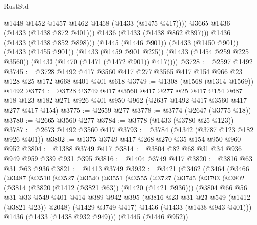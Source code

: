 \begin{lexlean}{RustStd}
\begin{coremodule}
                  @1448
                  @1452
                  @1457
                  @1462
                  @1468
                  (@1433 (@1475 @417))))
              @3665
              @1436
              (@1433 (@1438 @872 @401)))
            @1436
            (@1433 (@1438 @862 @897)))
          @1436
          (@1433 (@1438 @852 @898)))
        (@1445 (@1446 @901))
        (@1433 (@1450 @901))
        (@1433 (@1455 @901))
        (@1433 (@1459 @901 @225))
        (@1433 (@1464 @259 @225 @3560))
        (@1433 (@1470 (@1471 (@1472 @901)) @417))))
@3728 := @2597 @1492
@3745 := @3728 @1492 @417 @3560 @417 @277 @3565 @417 @154 @966 @23 @128 @25 @172 @668 @401 @401 @618
@3749 := @1308 (@1568 (@1314 @1569)) @1492
@3774 := @3728
    @3749
    @417
    @3560
    @417
    @277
    @25
    @417
    @154
    @687
    @18
    @123
    @182
    @271
    @926
    @401
    @950
    @962
    (@2637 @1492 @417 @3560 @417 @277 @417 @154)
@3775 := @2659 @277
@3778 := @3774 (@2647 (@3775 @18))
@3780 := @2665 @3560 @277
@3784 := @3778 (@1433 (@3780 @25 @123))
@3787 := @2673 @1492 @3560 @417
@3793 := @3784 (@1342 (@3787 @123 @182 @926 @401))
@3802 := @1375 @3749 @417 @268 @270 @35 @154 @950 @960 @952
@3804 := @1388 @3749 @417
@3814 := @3804 @82 @68 @31 @34 @936 @949 @959 @389 @931 @395
@3816 := @1404 @3749 @417
@3820 := @3816 @63 @31 @63 @936
@3821 := @1413 @3749
@3932 := @3421
    (@3462
      (@3464
        (@3466
          (@3487
            (@3510
              (@3527
                (@3540
                  (@3551
                    (@3555
                      (@3727
                        (@3745
                          (@3793
                            (@3802
                              (@3814
                                (@3820 (@1412 (@3821 @63)) (@1420 (@1421 @936)))
                                (@3804
                                  @66
                                  @56
                                  @31
                                  @33
                                  @549
                                  @401
                                  @414
                                  @389
                                  @942
                                  @395
                                  (@3816 @23 @31 @23 @549 (@1412 (@3821 @23)) @2048)
                                  (@1429 @3749 @417)
                                  @1436
                                  (@1433 (@1438 @943 @401)))
                                @1436
                                (@1433 (@1438 @932 @949)))
                              (@1445 (@1446 @952))

\end{coremodule}
\end{lexlean}
